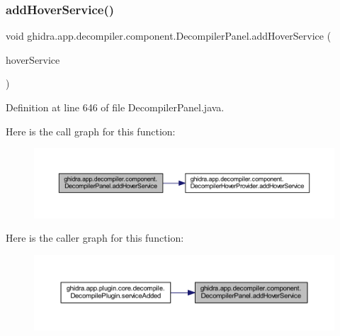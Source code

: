 \subsubsection{\texorpdfstring{addHoverService()}{addHoverService()}}
{\footnotesize\ttfamily void ghidra.\+app.\+decompiler.\+component.\+Decompiler\+Panel.\+add\+Hover\+Service (\begin{DoxyParamCaption}\item[{\mbox{\hyperlink{interfaceghidra_1_1app_1_1decompiler_1_1component_1_1hover_1_1_decompiler_hover_service}{Decompiler\+Hover\+Service}}}]{hover\+Service }\end{DoxyParamCaption})\hspace{0.3cm}{\ttfamily [inline]}}



Definition at line 646 of file Decompiler\+Panel.\+java.

Here is the call graph for this function\+:
\nopagebreak
\begin{figure}[H]
\begin{center}
\leavevmode
\includegraphics[width=350pt]{classghidra_1_1app_1_1decompiler_1_1component_1_1_decompiler_panel_a19c6d21a4fa34c95ae27816ffe2fa5aa_cgraph}
\end{center}
\end{figure}
Here is the caller graph for this function\+:
\nopagebreak
\begin{figure}[H]
\begin{center}
\leavevmode
\includegraphics[width=350pt]{classghidra_1_1app_1_1decompiler_1_1component_1_1_decompiler_panel_a19c6d21a4fa34c95ae27816ffe2fa5aa_icgraph}
\end{center}
\end{figure}
\mbox{\label{classghidra_1_1app_1_1decompiler_1_1component_1_1_decompiler_panel_a357e374bd4d157ddf0fcc3bd4945a566}} 
